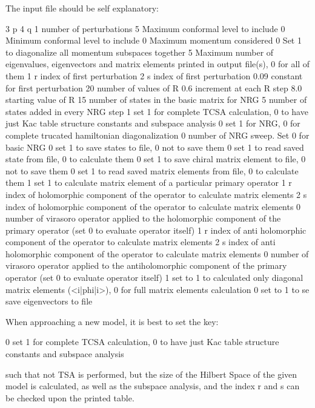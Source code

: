 The input file should be self explanatory\+: \begin{DoxyVerb}3    p
4    q
1    number of perturbations
5    Maximum conformal level to include
0    Minimum conformal level to include
0    Maximum momentum considered
0    Set 1 to diagonalize all momentum subspaces together
5   Maximum number of eigenvalues, eigenvectors and matrix elements printed in output file(s), 0 for all of them
1    r index of first perturbation
2    s index of first perturbation
0.09  constant for first perturbation
20   number of values of R
0.6  increment at each R step
8.0  starting value of R 
15  number of states in the basic matrix for NRG
5   number of states added in every NRG step
1    set 1 for complete TCSA calculation, 0 to have just Kac table structure constants and subspace analysis
0    set 1 for NRG, 0 for complete trucated hamiltonian diagonalization
0    number of NRG sweep. Set 0 for basic NRG
0    set 1 to save states to file, 0 not to save them
0    set 1 to read saved state from file, 0 to calculate them
0    set 1 to save chiral matrix element to file, 0 not to save them
0    set 1 to read saved matrix elements from file, 0 to calculate them
1    set 1 to calculate matrix element of a particular primary operator
1    r index of holomorphic component of the operator to calculate matrix elements
2    s index of holomorphic component of the operator to calculate matrix elements
0    number of virasoro operator applied to the holomorphic component of the primary operator (set 0 to evaluate operator itself)
1    r index of anti holomorphic component of the operator to calculate matrix elements
2    s index of anti holomorphic component of the operator to calculate matrix elements
0    number of virasoro operator applied to the antiholomorphic component of the primary operator (set 0 to evaluate operator itself)
1    set to 1 to calculated only diagonal matrix elements (<i|phi|i>), 0 for full matrix elements calculation
0    set to 1 to se save eigenvectors to file
\end{DoxyVerb}


When approaching a new model, it is best to set the key\+: \begin{DoxyVerb}0    set 1 for complete TCSA calculation, 0 to have just Kac table structure constants and subspace analysis
\end{DoxyVerb}


such that not {\ttfamily T\+SA} is performed, but the size of the Hilbert Space of the given model is calculated, as well as the subspace analysis, and the index r and s can be checked upon the printed table.

